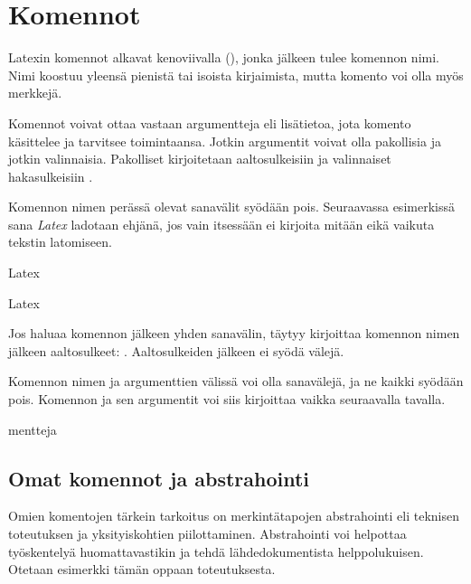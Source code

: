 \section{Komennot}
\label{luku:komennot}

Latexin komennot alkavat kenoviivalla (\koodi{\textbackslash}), jonka
jälkeen tulee komennon nimi. Nimi koostuu yleensä pienistä tai isoista
kirjaimista, mutta komento voi olla myös merkkejä.

Komennot voivat ottaa vastaan argumentteja eli lisätietoa, jota komento
käsittelee ja tarvitsee toimintaansa. Jotkin argumentit voivat olla
pakollisia ja jotkin valinnaisia. Pakolliset kirjoitetaan
aaltosulkeisiin \koodi{\{\ldots\}} ja valinnaiset hakasulkeisiin
\koodi{[\ldots]}.

\begin{koodilohkosis}
  \komento
\end{koodilohkosis}

Komennon nimen perässä olevat sanavälit syödään pois. Seuraavassa
esimerkissä sana \emph{Latex} ladotaan ehjänä, jos vain  itsessään ei kirjoita mitään eikä vaikuta tekstin latomiseen.

\pagebreak[3]

\begin{koodilohkosis}
  La\komento   tex
\end{koodilohkosis}

\begin{tulossis}
  Latex
\end{tulossis}

Jos haluaa komennon jälkeen yhden sanavälin, täytyy kirjoittaa komennon
nimen jälkeen aaltosulkeet: . Aaltosulkeiden
jälkeen ei syödä välejä.

Komennon nimen ja argumenttien välissä voi olla sanavälejä, ja ne kaikki
syödään pois. Komennon ja sen argumentit voi siis kirjoittaa vaikka
seuraavalla tavalla.

\begin{koodilohkosis}
     {mentteja}
\end{koodilohkosis}

\subsection{Omat komennot ja abstrahointi}

Omien komentojen tärkein tarkoitus on merkintätapojen abstrahointi eli
teknisen toteutuksen ja yksityiskohtien piilottaminen. Abstrahointi voi
helpottaa työskentelyä huomattavastikin ja tehdä lähdedokumentista
helppolukuisen. Otetaan esimerkki tämän oppaan toteutuksesta.

